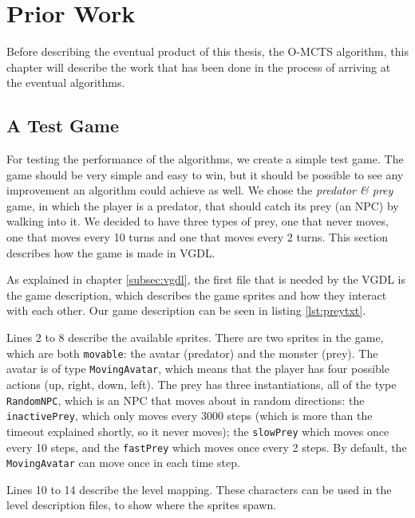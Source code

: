 \chapter{Prior Work}
Before describing the eventual product of this thesis, the O-MCTS algorithm,
this chapter will describe the work that has been done in the process of
arriving at the eventual algorithms. 

\section{A Test Game}





For testing the performance of the algorithms, we create a simple test game. The
game should be very simple and easy to win, but it should be possible to see any
improvement an algorithm could achieve as well. We chose the \emph{predator \&
prey} game, in which the player is a predator, that should catch its prey (an
NPC) by walking into it. We decided to have three types of prey, one that never
moves, one that moves every 10 turns and one that moves every 2 turns. This
section describes how the game is made in VGDL.

As explained in chapter \ref{subsec:vgdl}, the first file that is needed by the
VGDL is the game description, which describes the game sprites and how they
interact with each other. Our game description can be seen in listing
\ref{lst:preytxt}.


Lines 2 to 8 describe the available sprites. There are two sprites in the game,
which are both \texttt{movable}: the avatar (predator) and the monster (prey).
The avatar is of type \texttt{MovingAvatar}, which means that the player has
four possible actions (up, right, down, left). The prey has three
instantiations, all of the type \texttt{RandomNPC}, which is an NPC that moves
about in random directions: the \texttt{inactivePrey}, which only moves every
3000 steps (which is more than the timeout explained shortly, so it never
moves); the \texttt{slowPrey} which moves once every 10 steps, and the
\texttt{fastPrey} which moves once every 2 steps.  By default, the
\texttt{MovingAvatar} can move once in each time step.

Lines 10 to 14 describe the level mapping. These characters can be used in the
level description files, to show where the sprites spawn. 


